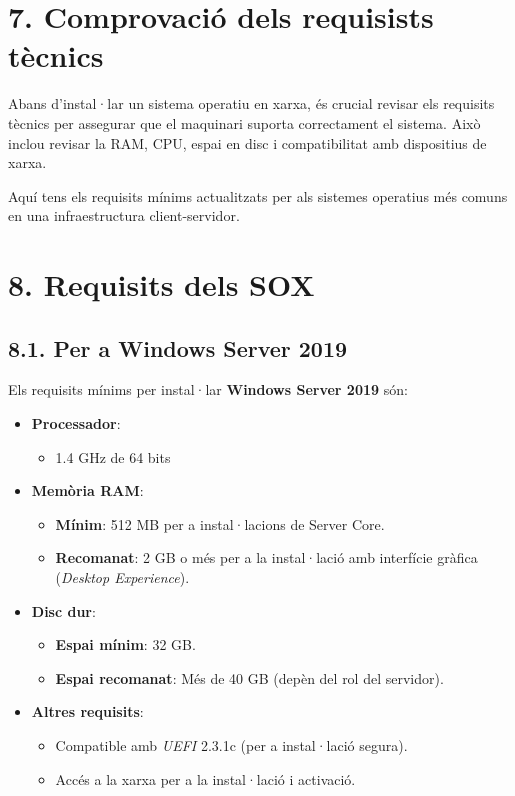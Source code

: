 \documentclass[
  a4paper,
]{article}
\providecommand{\tightlist}{%
  \setlength{\itemsep}{0pt}\setlength{\parskip}{0pt}}
\begin{document}
\section{7. Comprovació dels requisists
tècnics}\label{comprovaciuxf3-dels-requisists-tuxe8cnics}

Abans d'instal·lar un sistema operatiu en xarxa, és crucial revisar els
requisits tècnics per assegurar que el maquinari suporta correctament el
sistema. Això inclou revisar la RAM, CPU, espai en disc i compatibilitat
amb dispositius de xarxa.

Aquí tens els requisits mínims actualitzats per als sistemes operatius
més comuns en una infraestructura client-servidor.

\section{8. Requisits dels SOX}\label{requisits-dels-sox}

\subsection{8.1. Per a Windows Server
2019}\label{per-a-windows-server-2019}

Els requisits mínims per instal·lar \textbf{Windows Server 2019} són:

\begin{itemize}
\tightlist
\item
  \textbf{Processador}:

  \begin{itemize}
  \tightlist
  \item
    1.4 GHz de 64 bits
  \end{itemize}
\item
  \textbf{Memòria RAM}:

  \begin{itemize}
  \tightlist
  \item
    \textbf{Mínim}: 512 MB per a instal·lacions de Server Core.
  \item
    \textbf{Recomanat}: 2 GB o més per a la instal·lació amb interfície
    gràfica (\emph{Desktop Experience}).
  \end{itemize}
\item
  \textbf{Disc dur}:

  \begin{itemize}
  \tightlist
  \item
    \textbf{Espai mínim}: 32 GB.
  \item
    \textbf{Espai recomanat}: Més de 40 GB (depèn del rol del servidor).
  \end{itemize}
\item
  \textbf{Altres requisits}:

  \begin{itemize}
  \tightlist
  \item
    Compatible amb \emph{UEFI} 2.3.1c (per a instal·lació segura).
  \item
    Accés a la xarxa per a la instal·lació i activació.
  \end{itemize}
\end{itemize}
\end{document}
